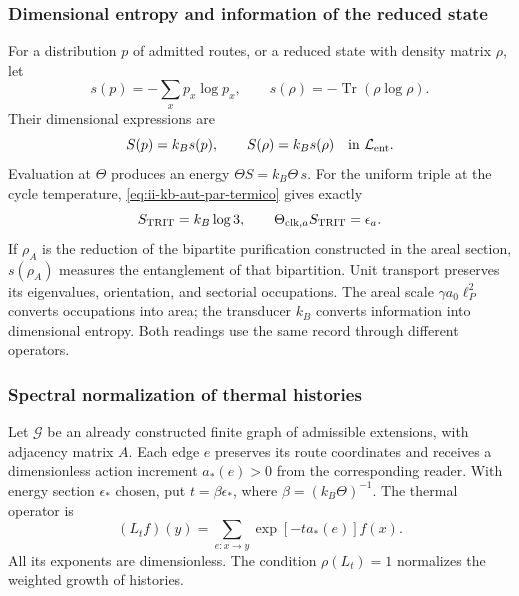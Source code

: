 \subsubsection{Dimensional entropy and information of the reduced state}

For a distribution \(p\) of admitted routes, or a reduced state
with density matrix \(\rho\), let
\[
 s(p)=-\sum_xp_x\log p_x,\qquad
 s(\rho)=-\operatorname{Tr}(\rho\log\rho).
\]
Their dimensional expressions are
\begin{equation}
 S(p)=k_Bs(p),\qquad S(\rho)=k_Bs(\rho)
 \quad\text{in }\mathcal L_{\rm ent}.
 \label{eq:ii-kb-aut-entropia}
\end{equation}
Evaluation at \(\Theta\) produces an energy
\(\Theta S=k_B\Theta\,s\). For the uniform triple at the cycle
temperature, \eqref{eq:ii-kb-aut-par-termico} gives exactly
\[
 S_{\rm TRIT}=k_B\log3,\qquad
 \Theta_{{\rm clk},a}S_{\rm TRIT}=\epsilon_a.
\]
If \(\rho_A\) is the reduction of the bipartite purification
constructed in the areal section, \(s(\rho_A)\) measures the entanglement
of that bipartition. Unit transport preserves its
eigenvalues, orientation, and sectorial occupations. The areal scale
\(\gamma a_0\ell_P^2\) converts occupations into area; the
transducer \(k_B\) converts information into dimensional entropy.
Both readings use the same record through different operators.

\subsubsection{Spectral normalization of thermal histories}

Let \(\mathcal G\) be an already constructed finite graph of admissible
extensions, with adjacency matrix \(A\). Each edge \(e\) preserves
its route coordinates and receives a dimensionless action increment
\(a_*(e)>0\) from the corresponding reader. With energy section
\(\epsilon_*\) chosen, put \(t=\beta\epsilon_*\), where
\(\beta=(k_B\Theta)^{-1}\). The thermal operator is
\begin{equation}
 (L_tf)(y)=\sum_{e:x\to y}\exp[-t a_*(e)]f(x).
 \label{eq:ii-kb-aut-operador}
\end{equation}
All its exponents are dimensionless. The condition
\(\rho(L_t)=1\) normalizes the weighted growth of histories.

